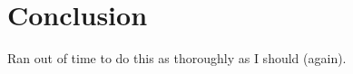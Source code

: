 \documentclass[11pt]{article}
\begin{document}
%
%
%
%
%


\section{Conclusion}
Ran out of time to do this as thoroughly as I should (again).
\end{document}
